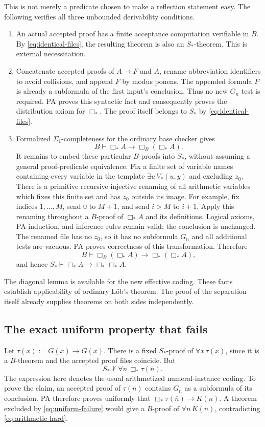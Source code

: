 \documentclass[11pt]{article}
\theoremstyle{remark}
\newcommand{\num}[1]{\overline{#1}}
\begin{document}
This is not merely a predicate chosen to make a reflection statement easy.
The following verifies all three unbounded derivability conditions.
\begin{enumerate}
\item An actual accepted proof has a finite acceptance computation verifiable
in $B$. By \eqref{eq:identical-files}, the resulting theorem is also an
$S_*$-theorem. This is external necessitation.
\item Concatenate accepted proofs of $A\to F$ and $A$, rename abbreviation
identifiers to avoid collisions, and append $F$ by modus ponens. The appended
formula $F$ is already a subformula of the first input's conclusion. Thus no
new $G_n$ test is required. PA proves this syntactic fact and consequently
proves the distribution axiom for $\Box_*$. The proof itself belongs to
$S_*$ by \eqref{eq:identical-files}.
\item Formalized $\Sigma_1$-completeness for the ordinary base checker gives
\[
 B\vdash\Box_*A\to\Box_B(\Box_*A).
\]
It remains to embed these particular $B$-proofs into $S_*$, without assuming
a general proof-predicate equivalence. Fix a finite set of variable names
containing every variable in the template $\exists u\,V_*(u,y)$ and excluding
$z_0$. There is a primitive recursive injective renaming of all arithmetic
variables which fixes this finite set and has $z_0$ outside its image. For
example, fix indices $1,\ldots,M$, send $0$ to $M+1$, and send $i>M$ to
$i+1$. Apply this renaming throughout a $B$-proof of $\Box_*A$ and its
definitions. Logical axioms, PA induction, and inference rules remain valid;
the conclusion is unchanged. The renamed file has no $z_0$, so it has no
subformula $G_n$ and all additional tests are vacuous. PA proves correctness
of this transformation. Therefore
\[
 B\vdash\Box_B(\Box_*A)\to\Box_*(\Box_*A),
\]
and hence $S_*\vdash\Box_*A\to\Box_*\Box_*A$.
\end{enumerate}
The diagonal lemma is available for the new effective coding. These facts
establish applicability of ordinary L\"ob's theorem. The proof of the
separation itself already supplies theorems on both sides independently.

\subsection{The exact uniform property that fails}

Let $\tau(x):=G(x)\to G(x)$. There is a fixed $S_*$-proof of
$\forall x\,\tau(x)$, since it is a $B$-theorem and the accepted proof files
coincide. But
\begin{equation}\label{eq:uniform-failure}
 S_*\nvdash\forall n\,\Box_*\tau(\num n).
\end{equation}
The expression here denotes the usual arithmetized numeral-instance coding.
To prove the claim, an accepted proof of $\tau(\num n)$ contains $G_n$ as a
subformula of its conclusion. PA therefore proves uniformly that
$\Box_*\tau(\num n)\to K(n)$. A theorem excluded by
\eqref{eq:uniform-failure} would give a $B$-proof of $\forall n\,K(n)$,
contradicting \eqref{eq:arithmetic-hard}.
\end{document}
